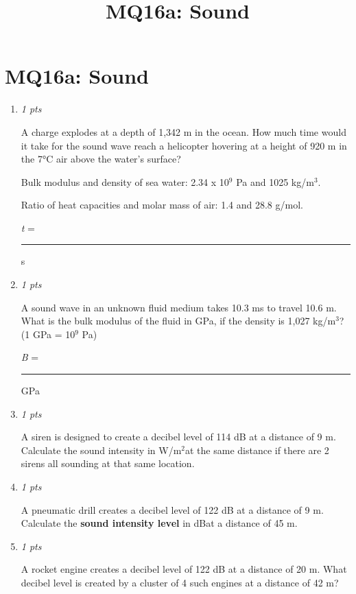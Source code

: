 \documentclass[11pt]{article}
\title{MQ16a: Sound}
\author{}
\date{}
\begin{document}
\maketitle

\section*{MQ16a: Sound}

\begin{enumerate}[leftmargin=*,label=\textbf{Question \arabic*.}]
\item \hfill \textit{1 pts}

A charge explodes at a depth of 1,342 m in the ocean. How much time would it take for the sound wave reach a helicopter hovering at a height of 920 m in the 7°C air above the water's surface?

Bulk modulus and density of sea water: 2.34 x 10$^{9}$ Pa and 1025 kg/m$^{3}$.

Ratio of heat capacities and molar mass of air: 1.4 and 28.8 g/mol.





\emph{t} = \rule{2cm}{0.4pt} s

\item \hfill \textit{1 pts}

A sound wave in an unknown fluid medium takes 10.3 ms to travel 10.6 m. What is the bulk modulus of the fluid in GPa, if the density is 1,027 kg/m$^{3}$? (1 GPa = 10$^{9}$ Pa)



\emph{B} = \rule{2cm}{0.4pt} GPa

\item \hfill \textit{1 pts}

A siren is designed to create a decibel level of 114 dB at a distance of 9 m. Calculate the sound intensity in W/m$^{2}$at the same distance if there are 2 sirens all sounding at that same location.

\item \hfill \textit{1 pts}

A pneumatic drill creates a decibel level of 122 dB at a distance of 9 m. Calculate the \textbf{sound intensity level }in dBat a distance of 45 m.

\item \hfill \textit{1 pts}

A rocket engine creates a decibel level of 122 dB at a distance of 20 m. What decibel level is created by a cluster of 4 such engines at a distance of 42 m?


\end{enumerate}
\end{document}
